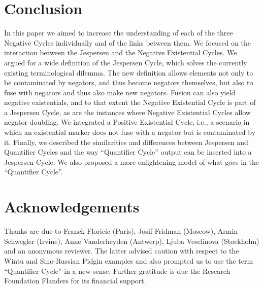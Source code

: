 ﻿\documentclass[output=paper,draft,draftmode,colorlinks,citecolor=brown]{langscibook}
\begin{document}
\section{Conclusion}\label{sec:int-6}

In this paper we aimed to increase the understanding of each of the three
Negative Cycles individually and of the links between them. We focused on
the interaction between the Jespersen and the Negative Existential Cycles.
We argued for a wide definition of the Jespersen Cycle, which solves the
currently existing terminological dilemma. The new definition allows
elements not only to be contaminated by negators, and thus become negators
themselves, but also to fuse with negators and thus also make new negators.
Fusion can also yield negative existentials, and to that extent the
Negative Existential Cycle is part of a Jespersen Cycle, as are the
instances where Negative Existential Cycles allow negator doubling. We
integrated a Positive Existential Cycle, i.e., a scenario in which an
existential marker does not fuse with a negator but is contaminated by it.
Finally, we described the similarities and differences between Jespersen
and Quantifier Cycles and the way ``Quantifier Cycle'' output can be inserted
into a Jespersen Cycle. We also proposed a more enlightening model of
what goes in the ``Quantifier Cycle''.

\section*{Acknowledgements} 

Thanks are due to Franck Floricic (Paris), Josif Fridman (Moscow), Armin
Schwegler (Irvine), Anne Vanderheyden (Antwerp), Ljuba Veselinova
(Stockholm) and an anonymous reviewer. The latter advised caution with
respect to the Wintu and Sino-Russian Pidgin examples and also prompted us
to use the term ``Quantifier Cycle'' in a new sense. Further gratitude is
due the Research Foundation Flanders for its financial support.
\end{document}
